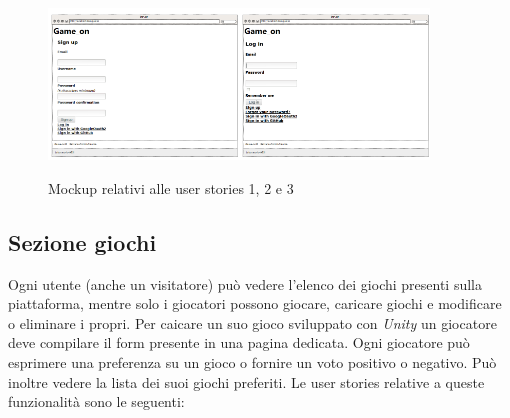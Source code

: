 \begin{figure}[h!]
\centering
\includegraphics[width=0.45\textwidth]{mockup_registration}\includegraphics[width=0.45\textwidth]{mockup_login}
\caption{Mockup relativi alle user stories 1, 2 e 3}
\end{figure}

\subsection{Sezione giochi}

Ogni utente (anche un visitatore) può vedere l'elenco dei giochi presenti sulla piattaforma, mentre solo i giocatori possono giocare, caricare giochi e modificare o eliminare i propri. Per caicare un suo gioco sviluppato con \textit{Unity} un giocatore deve compilare il form presente in una pagina dedicata. Ogni giocatore può esprimere una preferenza su un gioco o fornire un voto positivo o negativo. Può inoltre vedere la lista dei suoi giochi preferiti.
\newline
Le user stories relative a queste funzionalità sono le seguenti:

